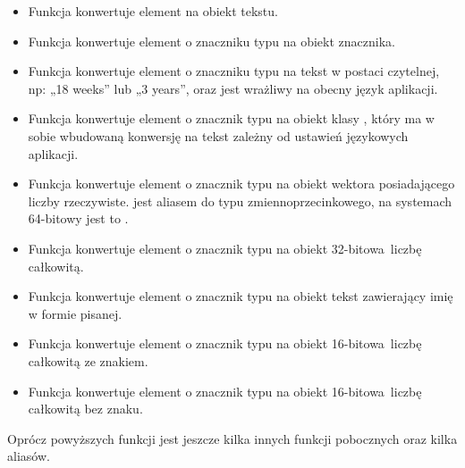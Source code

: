 \begin{itemize}
    \item {}

          Funkcja konwertuje element na obiekt tekstu.

    \item {}

          Funkcja konwertuje element o znaczniku typu  na obiekt znacznika.

    \item {}

          Funkcja konwertuje element o znaczniku typu  na tekst w postaci czytelnej, np: „18 weeks” lub „3 years”, oraz jest wrażliwy na obecny język aplikacji.

    \item {}

          Funkcja konwertuje element o znacznik typu  na obiekt klasy , który ma w sobie wbudowaną konwersję na tekst zależny od ustawień językowych aplikacji.

    \item {}

          Funkcja konwertuje element o znacznik typu  na obiekt wektora posiadającego liczby rzeczywiste.
           jest aliasem do typu zmiennoprzecinkowego, na systemach 64-bitowy jest to .

    \item {}

          Funkcja konwertuje element o znacznik typu  na obiekt 32-bitowa liczbę całkowitą.

    \item {}

          Funkcja konwertuje element o znacznik typu  na obiekt tekst zawierający imię w formie pisanej.

    \item {}

          Funkcja konwertuje element o znacznik typu  na obiekt 16-bitowa liczbę całkowitą ze znakiem.

    \item {}

          Funkcja konwertuje element o znacznik typu  na obiekt 16-bitowa liczbę całkowitą bez znaku.

\end{itemize}
Oprócz powyższych funkcji jest jeszcze kilka innych funkcji pobocznych oraz kilka aliasów.

